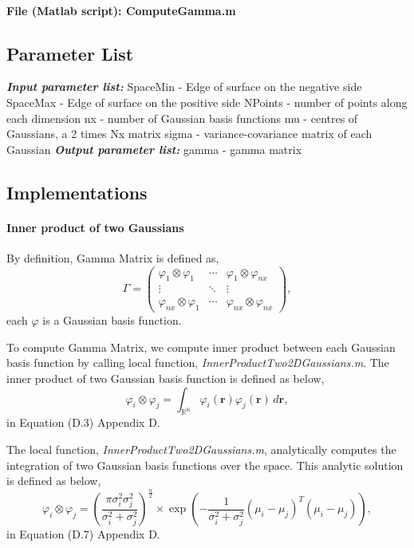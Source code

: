 \documentclass[a4paper, 12pt, english]{article}
\begin{document}
\paragraph{File (Matlab script): ComputeGamma.m}

\subsection{Parameter List}
\textbf{\textit{Input parameter list:}}\newline
SpaceMin - Edge of surface on the negative side\newline
SpaceMax - Edge of surface on the positive side\newline
NPoints - number of points along each dimension\newline
nx - number of Gaussian basis functions\newline
mu - centres of Gaussians, a 2 times Nx matrix\newline
sigma - variance-covariance matrix of each Gaussian\newline
\textbf{\textit{Output parameter list:}}\newline
gamma - gamma matrix

\subsection{Implementations}
\paragraph{Inner product of two Gaussians\newline}
By definition, Gamma Matrix is defined as,
$$\Gamma = \left(
\begin{array}{ccc}
\varphi_1\otimes\varphi_1&\cdots&\varphi_1\otimes\varphi_{nx}\\
\vdots&\ddots&\vdots\\
\varphi_{nx}\otimes\varphi_1&\cdots&\varphi_{nx}\otimes\varphi_{nx}
\end{array}
\right),$$ each $ \varphi$ is a Gaussian basis function.\par
To compute Gamma Matrix, we compute inner product between each Gaussian basis
function by calling local function, \textit{InnerProductTwo2DGaussians.m}. \newline The inner
product of two Gaussian basis function is defined as below,
$$\varphi_i\otimes\varphi_j=\int_{\mathbb{R}^\mathbb{N}}\varphi_i(\boldsymbol{r})\varphi_j(\boldsymbol{r})\,d\boldsymbol{r},$$
in Equation (D.3) Appendix D.\par
The local function, \textit{InnerProductTwo2DGaussians.m}, analytically computes the
integration of two Gaussian basis functions over the space. This analytic solution
is defined as below,
$$\varphi_i\otimes\varphi_j = \left(\frac{\pi\sigma^2_i\sigma^2_j}{\sigma^2_i+\sigma^2_j}\right)^{\frac{n}{2}}
\times\exp{\left(-\frac{1}{\sigma^2_i+\sigma^2_j}(\mu_i-\mu_j)^T(\mu_i-\mu_j)\right)}, $$
in Equation (D.7) Appendix D.
\end{document}
